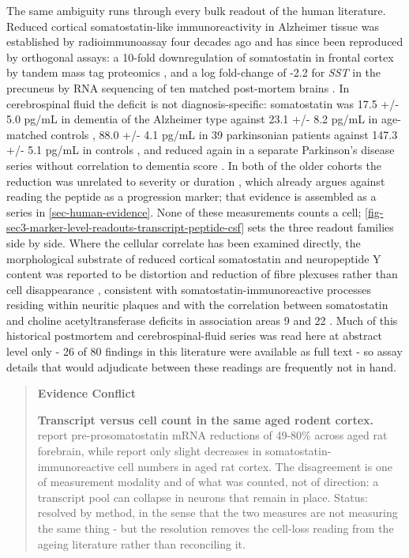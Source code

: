 \documentclass[11pt]{article}
\begin{document}
The same ambiguity runs through every bulk readout of the human literature. Reduced cortical somatostatin-like immunoreactivity in Alzheimer tissue was established by radioimmunoassay four decades ago \citep{Davies1980} and has since been reproduced by orthogonal assays: a 10-fold downregulation of somatostatin in frontal cortex by tandem mass tag proteomics \citep{Sathe2020}, and a log fold-change of -2.2 for \emph{SST} in the precuneus by RNA sequencing of ten matched post-mortem brains \citep{Guennewig2021}. In cerebrospinal fluid the deficit is not diagnosis-specific: somatostatin was 17.5 +/- 5.0 pg/mL in dementia of the Alzheimer type against 23.1 +/- 8.2 pg/mL in age-matched controls \citep{Atack1988}, 88.0 +/- 4.1 pg/mL in 39 parkinsonian patients against 147.3 +/- 5.1 pg/mL in controls \citep{Dupont1982}, and reduced again in a separate Parkinson's disease series without correlation to dementia score \citep{Strittmatter1996a}. In both of the older cohorts the reduction was unrelated to severity or duration \citep{Atack1988,Dupont1982}, which already argues against reading the peptide as a progression marker; that evidence is assembled as a series in \ref{sec-human-evidence}. None of these measurements counts a cell; \ref{fig-sec3-marker-level-readouts-transcript-peptide-csf} sets the three readout families side by side. Where the cellular correlate has been examined directly, the morphological substrate of reduced cortical somatostatin and neuropeptide Y content was reported to be distortion and reduction of fibre plexuses rather than cell disappearance \citep{Kowall1988}, consistent with somatostatin-immunoreactive processes residing within neuritic plaques \citep{Morrison1985} and with the correlation between somatostatin and choline acetyltransferase deficits in association areas 9 and 22 \citep{Dournaud1995}. Much of this historical postmortem and cerebrospinal-fluid series was read here at abstract level only - 26 of 80 findings in this literature were available as full text - so assay details that would adjudicate between these readings are frequently not in hand.

\begin{quote}
\noindent\textbf{Evidence Conflict}\par
\textbf{Transcript versus cell count in the same aged rodent cortex.} \citet{Florio1991} report pre-prosomatostatin mRNA reductions of 49-80\% across aged rat forebrain, while \citet{Cha1997} report only slight decreases in somatostatin-immunoreactive cell numbers in aged rat cortex. The disagreement is one of measurement modality and of what was counted, not of direction: a transcript pool can collapse in neurons that remain in place. Status: resolved by method, in the sense that the two measures are not measuring the same thing - but the resolution removes the cell-loss reading from the ageing literature rather than reconciling it.

\end{quote}
\end{document}
